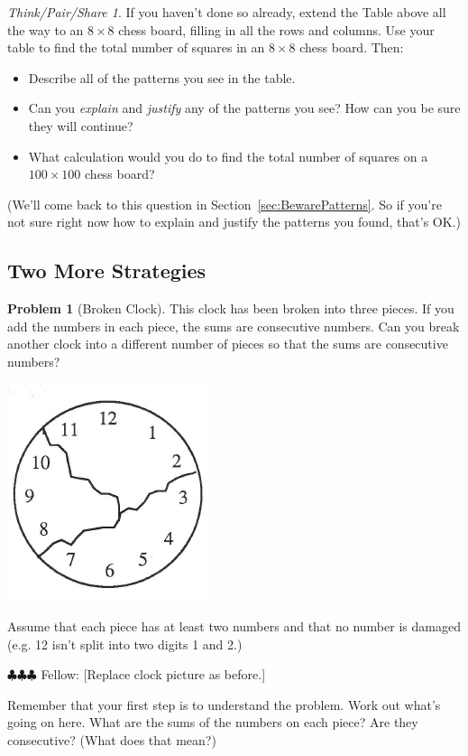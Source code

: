 \documentclass[10pt, reqno]{amsart}
\theoremstyle{remark}
\newtheorem*{thinkpair*}{Think/Pair/Share}
\theoremstyle{definition}
\newtheorem{problem}{Problem}
\numberwithin{equation}{section}  %
\newcommand{\fellow}[1]{{\color{magenta} \sf $\clubsuit\clubsuit\clubsuit$ Fellow: [#1]}}
\begin{document}
\begin{thinkpair*}
If you haven't done so already, extend the Table above all the way to an $8\times 8$ chess board, filling in all the rows and columns.  Use your table to find the total number of squares in an $8 \times 8$ chess board.  Then:
\begin{itemize}
\item
Describe all of the patterns you see in the table.  
\item
Can you \emph{explain} and \emph{justify} any of the patterns you see?  How can you be sure they will continue?
\item
What calculation would you do to find the total number of squares on a $100 \times 100$ chess board?
\end{itemize}
\end{thinkpair*}

(We'll come back to this question in Section~\ref{sec:BewarePatterns}.  So if you're not sure right now how to explain and justify the patterns you found, that's OK.)



\subsection{Two More Strategies}
\begin{problem}[Broken Clock]\label{prob:BrokenClock}
 This clock has been broken into three pieces.  If you add the numbers in each piece, the sums are consecutive numbers.  Can you break another clock into a different number of pieces so that the sums are consecutive numbers?  
\begin{center}
\includegraphics[height=3 cm]{clock}
\end{center}
Assume that each piece has at least two numbers and that no number is damaged (e.g. 12 isn't split into two digits 1 and 2.) 
\end{problem}


\fellow{Replace clock picture as before.}

Remember that your first step is to understand the problem.  Work out what's going on here.  What are the sums of the numbers on each piece?  Are they consecutive?  (What does that mean?)
\end{document}
